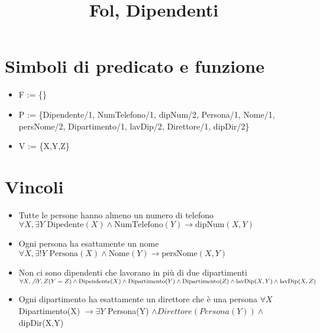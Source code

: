 \documentclass{article}
\begin{document}
\title{Fol, Dipendenti}
\maketitle

\section {Simboli di predicato e funzione}
\begin{itemize}
    \item F := \{\}
    \item P := \{Dipendente/1, NumTelefono/1, dipNum/2, Persona/1, Nome/1, persNome/2, Dipartimento/1, lavDip/2, Direttore/1, dipDir/2\}
    \item V := \{X,Y,Z\}
\end{itemize}


\section{Vincoli}
\begin{itemize}
    \item Tutte le persone hanno almeno un numero di telefono
    \subitem $\forall X, \exists Y \text{ Dipedente}(X) \land \text{NumTelefono}(Y) \rightarrow \text{dipNum}(X,Y)$  
    \item Ogni persona ha esattamente un nome
    \subitem $\forall X, \exists ! Y \text{ Persona}(X) \land \text{Nome}(Y) \rightarrow \text{persNome}(X,Y)$
    \item Non ci sono dipendenti che lavorano in più di due dipartimenti  
    \subitem  $\forall X, \not\exists Y,Z  (Y = Z) \land \text{Dipendente}(X) \land \text{Dipartimento}(Y) \land \text{Dipartimento}(Z) \land \text{lavDip}(X,Y) \land \text{lavDip}(X,Z)$
    \item Ogni dipartimento ha esattamente un direttore che è una persona
    \subitem $\forall X$  Dipartimento(X) $ \rightarrow  \exists Y$ Persona(Y) $\land Direttore(Persona(Y)) \land$ dipDir(X,Y)
\end{itemize}
\end{document}
